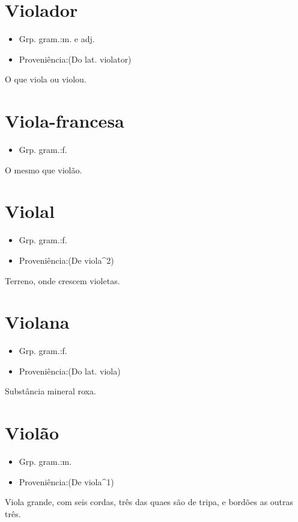 \documentclass{article}
\begin{document}
\section{Violador}
\begin{itemize}
\item {Grp. gram.:m.  e  adj.}
\end{itemize}
\begin{itemize}
\item {Proveniência:(Do lat. \textunderscore violator\textunderscore )}
\end{itemize}
O que viola ou violou.
\section{Viola-francesa}
\begin{itemize}
\item {Grp. gram.:f.}
\end{itemize}
O mesmo que \textunderscore violão\textunderscore .
\section{Violal}
\begin{itemize}
\item {Grp. gram.:f.}
\end{itemize}
\begin{itemize}
\item {Proveniência:(De \textunderscore viola\textunderscore ^2)}
\end{itemize}
Terreno, onde crescem violetas.
\section{Violana}
\begin{itemize}
\item {Grp. gram.:f.}
\end{itemize}
\begin{itemize}
\item {Proveniência:(Do lat. \textunderscore viola\textunderscore )}
\end{itemize}
Substância mineral roxa.
\section{Violão}
\begin{itemize}
\item {Grp. gram.:m.}
\end{itemize}
\begin{itemize}
\item {Proveniência:(De \textunderscore viola\textunderscore ^1)}
\end{itemize}
Viola grande, com seis cordas, três das quaes são de tripa, e bordões as outras três.
\end{document}
